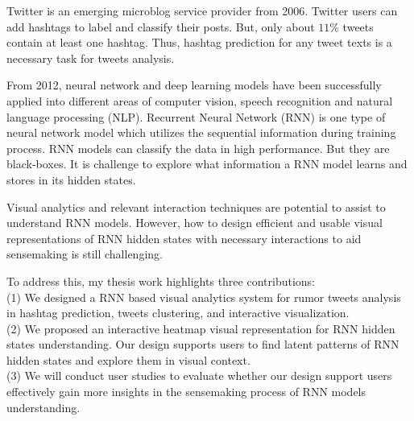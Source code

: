 
Twitter is an emerging microblog service provider from 2006. Twitter users can add hashtags to label and classify their posts. But, only about $11\%$ tweets contain at least one hashtag. Thus, hashtag prediction for any tweet texts is a necessary task for tweets analysis. 

 From 2012, neural network and deep learning models have been successfully applied into different areas of computer vision, speech recognition and natural language processing (NLP). Recurrent Neural Network (RNN) is one type of neural network model which utilizes the sequential information during training process. RNN models can classify the data in high performance. But they are black-boxes. It is challenge to explore what information a RNN model learns and stores in its hidden states.  
 
 Visual analytics and relevant interaction techniques are potential to assist to understand RNN models. However, how to design efficient and usable visual representations of RNN hidden states with necessary interactions to aid sensemaking is still challenging.

To address this, my thesis work highlights three contributions: \\
(1) We designed a RNN based visual analytics system for rumor tweets analysis in hashtag prediction, tweets clustering, and interactive visualization.\\
(2) We proposed an interactive heatmap visual representation for RNN hidden states understanding. Our design supports users to find latent patterns of RNN hidden states and explore them in visual context.\\
(3) We will conduct user studies to evaluate whether our design support users effectively gain more insights in the sensemaking process of RNN models understanding. 





